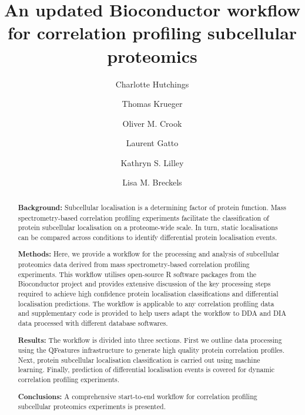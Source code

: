 \documentclass[9pt,a4paper,]{extarticle}
\begin{document}
\pagestyle{front}

\title{An updated Bioconductor workflow for correlation profiling subcellular proteomics}

\author[1]{Charlotte Hutchings}
\author[2]{Thomas Krueger}
\author[3]{Oliver M. Crook}
\author[4]{Laurent Gatto}
\author[1]{Kathryn S. Lilley}
\author[1]{Lisa M. Breckels}

\maketitle
\thispagestyle{front}

\begin{abstract}
\hfill\break
\textbf{Background:} Subcellular localisation is a determining factor of protein function.
Mass spectrometry-based correlation profiling experiments facilitate the classification
of protein subcellular localisation on a proteome-wide scale. In turn, static
localisations can be compared across conditions to identify differential protein
localisation events.

\textbf{Methods:} Here, we provide a workflow for the processing and analysis
of subcellular proteomics data derived from mass spectrometry-based correlation
profiling experiments. This workflow utilises open-source R software packages
from the Bioconductor project and provides extensive discussion of the key
processing steps required to achieve high confidence protein localisation
classifications and differential localisation predictions. The workflow is
applicable to any correlation profiling data and supplementary code is
provided to help users adapt the workflow to DDA and DIA data processed with
different database softwares.

\textbf{Results:} The workflow is divided into three sections. First we outline
data processing using the QFeatures infrastructure to generate high quality
protein correlation profiles. Next, protein subcellular localisation classification
is carried out using machine learning. Finally,
prediction of differential localisation events is covered for dynamic correlation
profiling experiments.

\textbf{Conclusions:} A comprehensive start-to-end workflow for correlation profiling
subcellular proteomics experiments is presented.
\end{abstract}
\end{document}
